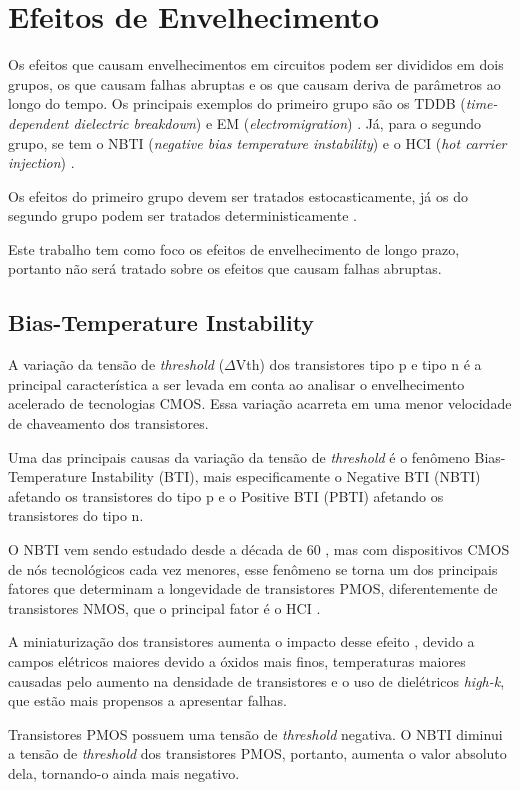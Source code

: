 \section{Efeitos de Envelhecimento}
Os efeitos que causam envelhecimentos em circuitos podem ser divididos em dois grupos, os que causam falhas abruptas e os que causam deriva de parâmetros ao longo do tempo. Os principais exemplos do primeiro grupo são os TDDB (\textit{time-dependent dielectric breakdown}) e EM (\textit{electromigration}) \cite{Lorenz}. Já, para o segundo grupo, se tem o NBTI (\textit{negative bias temperature instability}) e o HCI (\textit{hot carrier injection}) \cite{Lorenz}.

Os efeitos do primeiro grupo devem ser tratados estocasticamente, já os do segundo grupo podem ser tratados deterministicamente \cite{Lorenz}.
       
Este trabalho tem como foco os efeitos de envelhecimento de longo prazo, portanto não será tratado sobre os efeitos que causam falhas abruptas.

\subsection{Bias-Temperature Instability}
A variação da tensão de \textit{threshold} ($\Delta$Vth) dos transistores tipo p e tipo n é a principal característica a ser levada em conta ao analisar o envelhecimento acelerado de tecnologias CMOS. Essa variação acarreta em uma menor velocidade de chaveamento dos transistores.

Uma das principais causas da variação da tensão de \textit{threshold} é o fenômeno Bias-Temperature Instability (BTI), mais especificamente o Negative BTI (NBTI) afetando os transistores do tipo p e o Positive BTI (PBTI) afetando os transistores do tipo n.

O NBTI vem sendo estudado desde a década de 60 \cite{Alam}, mas com dispositivos CMOS de nós tecnológicos cada vez menores, esse fenômeno se torna um dos principais fatores que determinam a longevidade de transistores PMOS, diferentemente de transistores NMOS, que o principal fator é o HCI \cite{Bhardwaj}.

A miniaturização dos transistores aumenta o impacto desse efeito \cite{Banaszeski}, devido a campos elétricos maiores devido a óxidos mais finos, temperaturas maiores causadas pelo aumento na densidade de transistores e o uso de dielétricos \textit{high-k}, que estão mais propensos a apresentar falhas.

Transistores PMOS possuem uma tensão de \textit{threshold} negativa. O NBTI diminui a tensão de \textit{threshold} dos transistores PMOS, portanto, aumenta o valor absoluto dela, tornando-o ainda mais negativo.




% 
